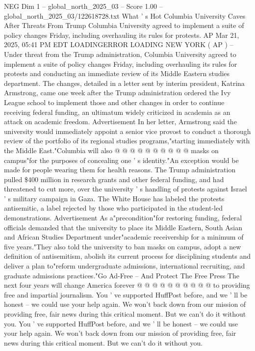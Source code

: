 \begin{textsample}{NEG Dim 1 – global\_north\_2025\_03 – Score 1.00 – global\_north\_2025\_03/122618728.txt}  \label{ex:f1_neg_056}
What ' s Hot Columbia University Caves After Threats From Trump Columbia University agreed to implement a suite of policy changes Friday, including overhauling its rules for protests.
AP Mar 21, 2025, 05:41 PM EDT LOADINGERROR LOADING NEW YORK ( AP ) -- Under threat from the Trump administration, Columbia University agreed to implement a suite of policy changes Friday, including overhauling its rules for protests and conducting an immediate review of its Middle Eastern studies department.
The changes, detailed in a letter sent by interim president, Katrina Armstrong, came one week after the Trump administration ordered the Ivy League school to implement those and other changes in order to continue receiving federal funding, an ultimatum widely criticized in academia as an attack on academic freedom.
Advertisement In her letter, Armstrong said the university would immediately appoint a senior vice provost to conduct a thorough review of the portfolio of its regional studies programs,"starting immediately with the Middle East."Columbia will also @ @ @ @ @ @ @ @ @ @ masks on campus"for the purposes of concealing one ' s identity."An exception would be made for people wearing them for health reasons.
The Trump administration pulled \$400 million in research grants and other federal funding, and had threatened to cut more, over the university ' s handling of protests against Israel ' s military campaign in Gaza.
The White House has labeled the protests antisemitic, a label rejected by those who participated in the student-led demonstrations.
Advertisement As a"precondition"for restoring funding, federal officials demanded that the university to place its Middle Eastern, South Asian and African Studies Department under"academic receivership for a minimum of five years."They also told the university to ban masks on campus, adopt a new definition of antisemitism, abolish its current process for disciplining students and deliver a plan to"reform undergraduate admissions, international recruiting, and graduate admissions practices."Go Ad-Free -- And Protect The Free Press The next four years will change America forever @ @ @ @ @ @ @ @ @ @ to providing free and impartial journalism.
You ' ve supported HuffPost before, and we ' ll be honest -- we could use your help again.
We won't back down from our mission of providing free, fair news during this critical moment.
But we can't do it without you.
You ' ve supported HuffPost before, and we ' ll be honest -- we could use your help again.
We won't back down from our mission of providing free, fair news during this critical moment.
But we can't do it without you.

\end{textsample}
